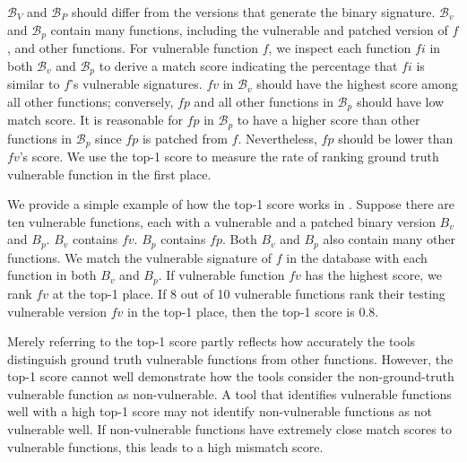 $\mathcal{B}_{V}$ and $\mathcal{B}_{P}$ should differ from the versions that generate the binary signature. $\mathcal{B}_{v}$ and $\mathcal{B}_{p}$ contain many functions, including the vulnerable and patched version of $f$, and other functions. 
For vulnerable function $f$, we inspect each function $fi$ in both $\mathcal{B}_{v}$ and $\mathcal{B}_{p}$ to derive a match score indicating the percentage that $fi$ is similar to $f$'s vulnerable signatures. 
$fv$ in $\mathcal{B}_{v}$ should have the highest score among all other functions; conversely, $fp$ and all other functions in $\mathcal{B}_{p}$ should have low match score. It is reasonable for $fp$ in $\mathcal{B}_{p}$ to have a higher score than other functions in $\mathcal{B}_{p}$ since $fp$ is patched from $f$. 
Nevertheless, $fp$ should be lower than $fv$'s score.
We use the top-1 score to measure the rate of ranking ground truth vulnerable function in the first place. 


We provide a simple example of how the top-1 score works in \name. 
Suppose there are ten vulnerable functions, each with a vulnerable and a patched binary version ${B}_{v}$ and ${B}_{p}$. ${B}_{v}$ contains $fv$. ${B}_{p}$ contains $fp$. Both ${B}_{v}$ and ${B}_{p}$ also contain many other functions.
We match the vulnerable signature of $f$ in the database with each function in both ${B}_{v}$ and ${B}_{p}$. 
If vulnerable function $fv$ has the highest score, we rank $fv$ at the top-1 place.  
If 8 out of 10 vulnerable functions rank their testing vulnerable version $fv$ in the top-1 place, then the top-1 score is 0.8. 

Merely referring to the top-1 score partly reflects how accurately the tools distinguish ground truth vulnerable functions from other functions. 
However, the top-1 score cannot well demonstrate how the tools consider the non-ground-truth vulnerable function as non-vulnerable. 
A tool that identifies vulnerable functions well with a high top-1 score may not identify non-vulnerable functions as not vulnerable well.
If non-vulnerable functions have extremely close match scores to vulnerable functions, this leads to a high mismatch score.


